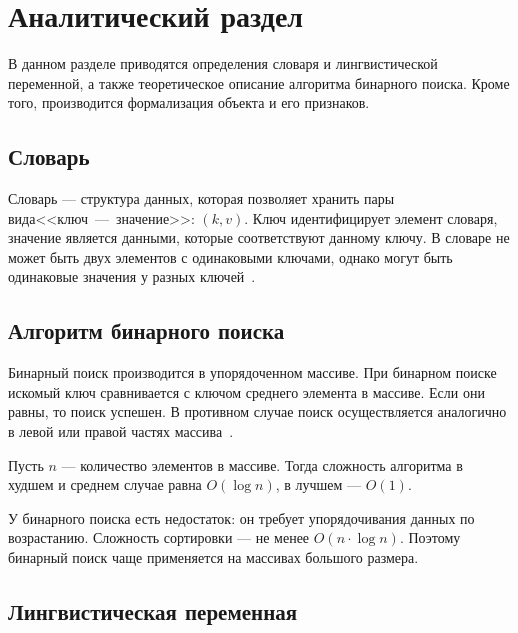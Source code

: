 \section{Аналитический раздел \hfill}
\vspace{\baselineskip}

В данном разделе приводятся определения словаря и лингвистической переменной, а также теоретическое описание алгоритма бинарного поиска. Кроме того, производится формализация объекта и его признаков.

\vspace{\baselineskip}
\subsection{Словарь}
\vspace{\baselineskip}

Словарь --- структура данных, которая позволяет хранить пары вида\linebreak <<ключ~---~значение>>: $(k, v)$. Ключ идентифицирует элемент словаря, значение является данными, которые соответствуют данному ключу. В словаре не может быть двух элементов с одинаковыми ключами, однако могут быть одинаковые значения у разных ключей~\cite{dict}.

\vspace{\baselineskip}
\subsection{Алгоритм бинарного поиска}
\vspace{\baselineskip}

Бинарный поиск производится в упорядоченном массиве.
При бинарном поиске искомый ключ сравнивается с ключом среднего элемента в массиве. 
Если они равны, то поиск успешен. 
В противном случае поиск осуществляется аналогично в левой или правой частях массива~\cite{binary}.

Пусть $n$ --- количество элементов в массиве. 
Тогда сложность алгоритма в худшем и среднем случае равна $O(\log{n})$, в лучшем --- $O(1)$.

У бинарного поиска есть недостаток: он требует упорядочивания данных по возрастанию. Сложность сортировки --- не менее $O(n\cdot\log{n})$. Поэтому бинарный поиск чаще применяется на массивах большого размера.

\vspace{\baselineskip}
\subsection{Лингвистическая переменная}
\vspace{\baselineskip}

